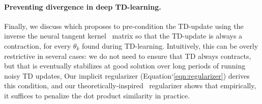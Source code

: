 \paragraph{Preventing divergence in deep TD-learning.} Finally, we discuss \citet{achiam2019towards} which proposes to pre-condition the TD-update using the inverse the neural tangent kernel~\citep{ntk} matrix so that the TD-update is always a contraction, for every $\theta_k$ found during TD-learning. Intuitively, this can be overly restrictive in several cases: we do not need to ensure that TD always contracts, but that is eventually stabilizes at good solution over long periods of running noisy TD updates, Our implicit regularizer (Equation`\ref{eqn:regularizer}) derives this condition, and our theoretically-inspired \methodname\ regularizer shows that empirically, it suffices to penalize the dot product similarity in practice.   


